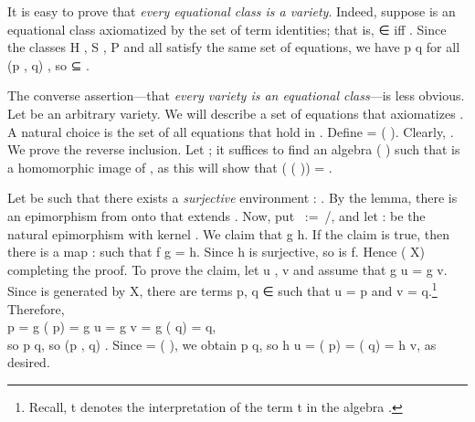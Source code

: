 It is easy to prove that \emph{every equational class is a variety}.  Indeed, suppose  is an equational
class axiomatized by the set  of term identities; that is,  ∈  iff
  . Since the classes \af H , \af S , \af P  and
 all satisfy the same set of equations, we have    \ab p
 \ab q for all (\ab p , \ab q)  , so   ⊆ .

The converse assertion---that \emph{every variety is an equational class}---is less obvious.
Let  be an arbitrary variety.  We will describe a set of equations that axiomatizes
.  A natural choice is the set
  of all equations that hold in . Define  =  (
).  Clearly,   . We prove the reverse inclusion. Let 
 ; it suffices to find an algebra    ( ) such
that  is a homomorphic image of , as this will show that 
  ( ( )) = .

Let  be such that there exists a \emph{surjective} environment
 :   .
By the  lemma, there is an epimorphism  from  onto 
that extends .
Now, put ~:=~/, and let  :   
be the natural epimorphism with kernel . We claim that  \ab g 
 \ab h. If the claim is true, then there is a map  :   
such that \ab f  \ab g = \ab h. Since \ab h is surjective, so is \ab f. Hence 
  ( \ab X)   completing the proof.
To prove the claim, let \ab u , \ab v   and assume that \ab g \ab u =
\ab g \ab v. Since  is generated by \ab X, there are terms \ab p, \ab q ∈
 such that \ab u =  \ab p and v =  \ab
q.\footnote{Recall,  \ab t denotes the interpretation of the term
\ab t in the algebra .} Therefore,\\[-4pt]

 \ab p = \ab g ( \ab p) = \ab g \ab u = \ab g \ab v =
\ab g ( \ab q) =  \ab q,\\[8pt]
so   \ab p  \ab q, so (\ab p , \ab q)  
. Since    =
 ( ), we obtain   \ab p  \ab q, so \ab h
\ab u = ( \ab p)   = ( \ab q)
  = \ab h \ab v, as desired.


